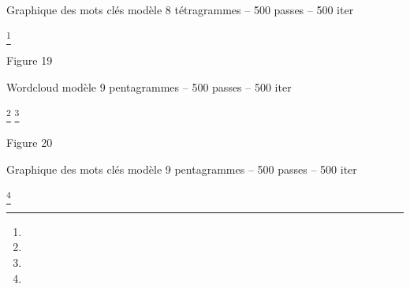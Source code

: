 \documentclass[letterpaper,portrait,12pt]{article}
\begin{document}
Graphique des mots cl\'{e}s mod\`{e}le 8 t\'{e}tragrammes -- 500 passes -- 500 iter


\footnote{} 






























































Figure 19





Wordcloud mod\`{e}le 9 pentagrammes -- 500 passes -- 500 iter











\footnote{} \footnote{} 














Figure 20





Graphique des mots cl\'{e}s mod\`{e}le 9 pentagrammes -- 500 passes -- 500 iter








\footnote{} 
\end{document}
